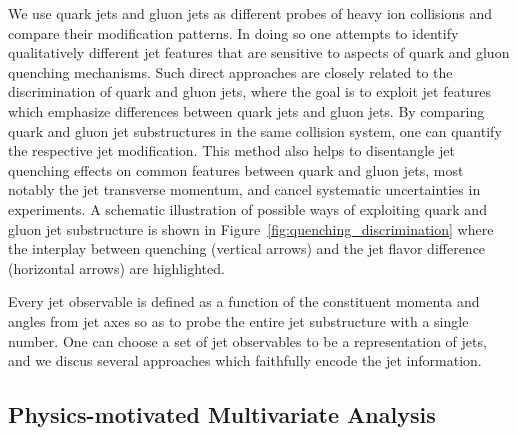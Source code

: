 \documentclass[notoc,preprintnumbers]{JHEP3}
\begin{document}
We use quark jets and gluon jets as different probes of heavy ion collisions and compare their modification patterns. In doing so one attempts to identify qualitatively different jet features that are sensitive to aspects of quark and gluon quenching mechanisms. Such direct approaches are closely related to the discrimination of quark and gluon jets, where the goal is to exploit jet features which emphasize differences between quark jets and gluon jets. By comparing quark and gluon jet substructures in the same collision system, one can quantify the respective jet modification. This method also helps to disentangle jet quenching effects on common features between quark and gluon jets, most notably the jet transverse momentum, and cancel systematic uncertainties in experiments. A schematic illustration of possible ways of exploiting quark and gluon jet substructure is shown in Figure~\ref{fig:quenching_discrimination} where the interplay between quenching (vertical arrows) and the jet flavor difference (horizontal arrows) are highlighted.

Every jet observable is defined as a function of the constituent momenta and angles from jet axes so as to probe the entire jet substructure with a single number. One can choose a set of jet observables to be a representation of jets, and we discus several approaches which faithfully encode the jet information.

\subsection{Physics-motivated Multivariate Analysis}
\label{sec:mva}
\end{document}
